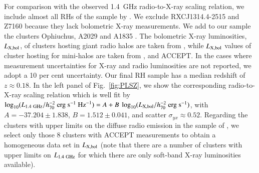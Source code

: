 \documentclass[useAMS,usenatbib]{mn2e}
\begin{document}
\begin{appendix}
For comparison with the observed 1.4~GHz radio-to-X-ray scaling relation, we
include almost all RHs of the sample by \cite{2011A&A...527A..99E}. 
We exclude RXCJ1314.4-2515 and Z7160 because they lack bolometric X-ray measurements. 
We add to our sample the clusters Ophiuchus, A2029 and A1835
\citep{2009A&A...499..371G}. The bolometric X-ray luminosities,
$L_{{\mathrm{X,bol}}}$, of clusters hosting giant radio halos are taken from
\cite{2009A&A...507..661B}, while $L_{{\mathrm{X,bol}}}$ values of cluster hosting
for mini-halos are taken from \cite{2002ApJ...567..716R},
\cite{Boehringer:1998vv} and ACCEPT. In the cases where measurement
uncertainties for X-ray and radio luminosities are not reported, we adopt a
10 per cent uncertainty. Our final RH sample has a median redshift of
$z\approx0.18$. In the left panel of Fig.~\ref{fig:PLSZ}, we show the
corresponding radio-to-X-ray scaling relation which is well fit by $\log_{10}
(L_{1.4~{\mathrm{GHz}}}/h_{70}^{-2}~{\mathrm{erg}}~{\mathrm{s}}^{-1}~{\mathrm{Hz}}^{-1}) = A +
B~\log_{10} (L_{{\mathrm{X,bol}}}/h_{70}^{-2}~{\mathrm{erg}}~{\mathrm{s}}^{-1})$, with
$A=-37.204\pm1.838$, $B=1.512\pm0.041$, and scatter $\sigma_{yx} \approx
0.52$. Regarding the clusters with upper limits on the diffuse radio emission in
the sample of \cite{2011A&A...527A..99E}, we select only those 8 clusters with
ACCEPT measurements to obtain a homogeneous data set in $L_{{\mathrm{X,bol}}}$ (note
that there are a number of clusters with upper limits on $L_{1.4~{\mathrm{GHz}}}$ for
which there are only soft-band X-ray luminosities available).


\end{appendix}
\end{document}
